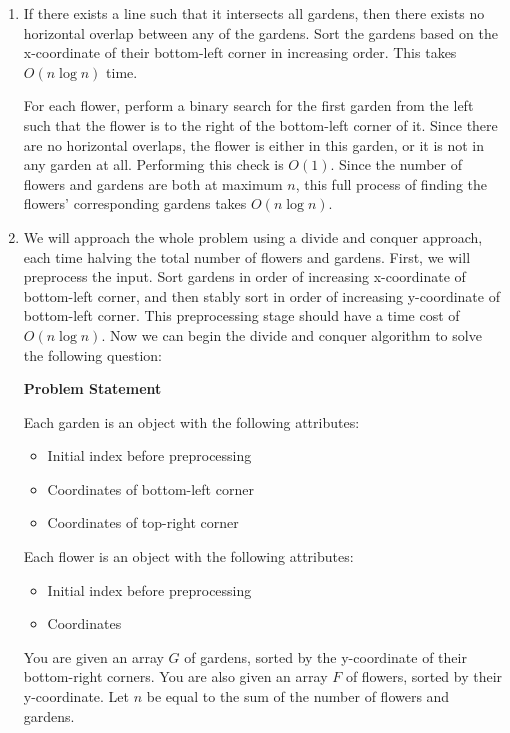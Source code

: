 \documentclass{article}
\begin{document}
\begin{solution}
\begin{enumerate}[label = (\alph*)]
    \item If there exists a line such that it intersects all gardens, then there exists no horizontal overlap between any of the gardens.
    Sort the gardens based on the x-coordinate of their bottom-left corner in increasing order. This takes $O(n\log n)$ time.
    
    For each flower, perform a binary search for the first garden from the left such that the flower is to the right of the bottom-left corner of it.
    Since there are no horizontal overlaps, the flower is either in this garden, or it is not in any garden at all. Performing this check is $O(1)$.
    Since the number of flowers and gardens are both at maximum $n$, this full process of finding the flowers' corresponding gardens takes $O(n\log n)$.

    \item We will approach the whole problem using a divide and conquer approach, each time halving the total number of flowers and gardens.
    First, we will preprocess the input. Sort gardens in order of increasing x-coordinate of bottom-left corner, and then stably sort in order of increasing y-coordinate of bottom-left corner. This preprocessing stage should have a time cost of $O(n\log n)$.
    Now we can begin the divide and conquer algorithm to solve the following question:

    \textbf{Problem Statement}

    Each garden is an object with the following attributes:
    \begin{itemize}
        \item Initial index before preprocessing
        \item Coordinates of bottom-left corner
        \item Coordinates of top-right corner
    \end{itemize}
    Each flower is an object with the following attributes:
    \begin{itemize}
        \item Initial index before preprocessing 
        \item Coordinates
    \end{itemize}

    You are given an array $G$ of gardens, sorted by the y-coordinate of their bottom-right corners.
    You are also given an array $F$ of flowers, sorted by their y-coordinate.
    Let $n$ be equal to the sum of the number of flowers and gardens.


\end{enumerate}
\end{solution}
\end{document}
